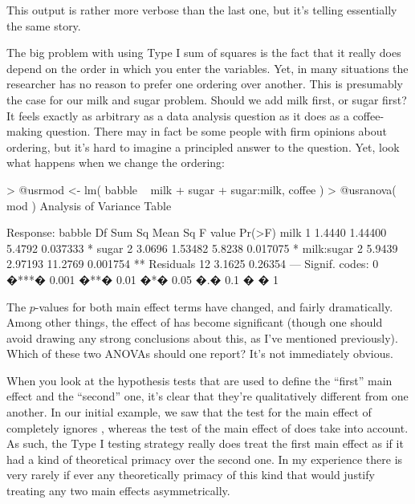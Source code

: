 This output is rather more verbose than the last one, but it's telling essentially  the same story.

The big problem with using Type I sum of squares is the fact that it really does depend on the order in which you enter the variables. Yet, in many situations the researcher has no reason to prefer one ordering over another. This is presumably the case for our milk and sugar problem. Should we add milk first, or sugar first? It feels exactly as arbitrary as a data analysis question as it does as a coffee-making question. There may in fact be some people with firm opinions about ordering, but it's hard to imagine a principled answer to the question. Yet, look what happens when we change the ordering:
\begin{rblock1}
> @usr{mod <- lm( babble ~  milk + sugar + sugar:milk, coffee )}
> @usr{anova( mod )}
Analysis of Variance Table

Response: babble
           Df Sum Sq Mean Sq F value   Pr(>F)   
milk        1 1.4440 1.44400  5.4792 0.037333 * 
sugar       2 3.0696 1.53482  5.8238 0.017075 * 
milk:sugar  2 5.9439 2.97193 11.2769 0.001754 **
Residuals  12 3.1625 0.26354                    
---
Signif. codes:  0 �***� 0.001 �**� 0.01 �*� 0.05 �.� 0.1 � � 1 
\end{rblock1}
The $p$-values for both main effect terms have changed, and fairly dramatically. Among other things, the effect of  has become significant (though one should avoid drawing any strong conclusions about this, as I've mentioned previously). Which of these two ANOVAs should one report? It's not immediately obvious. 

When you look at the hypothesis tests that are used to define the ``first'' main effect and the ``second'' one, it's clear that they're qualitatively different from one another. In our initial example, we saw that the test for the main effect of  completely ignores , whereas the test of the main effect of  does take  into account. As such, the Type I testing strategy really does treat the first main effect as if it had a kind of theoretical primacy over the second one. In my experience there is very rarely if ever any theoretically primacy of this kind that would justify treating any two main effects asymmetrically. 

